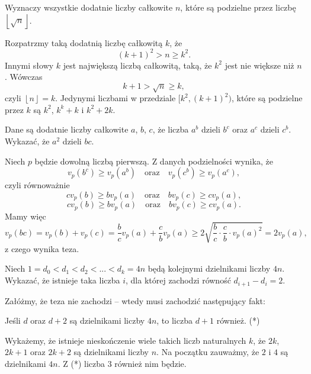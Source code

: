 \newpage
{}

\begin{problem}{1}
	Wyznaczy wszystkie dodatnie liczby całkowite $n$, które są podzielne przez liczbę~$\left\lfloor \sqrt{n} \right\rfloor$.
\end{problem}


\noindent
Rozpatrzmy taką dodatnią liczbę całkowitą $k$, że
\[
	(k + 1)^2 > n \geqslant k^2.
\]
Innymi słowy $k$ jest największą liczbą całkowitą, taką, że $k^2$ jest nie większe niż $n$. Wówczas
\[
	k + 1 > \sqrt{n} \geqslant k,
\]
czyli $\left\lfloor n \right\rfloor = k$. Jedynymi liczbami w przedziale $[k^2, (k + 1)^2)$, które są podzielne przez $k$ są $k^2$, $k^k + k$ i $k^2 + 2k$.


\begin{problem}{2}
	Dane są dodatnie liczby całkowite $a$, $b$, $c$, że liczba $a^b$ dzieli $b^c$ oraz $a^c$ dzieli $c^b$. Wykazać, że $a^2$ dzieli $bc$.
\end{problem}

\noindent
Niech $p$ będzie dowolną liczbą pierwszą.
Z danych podzielności wynika, że
\[
	v_p(b^c) \geqslant v_p(a^b) \quad \text{oraz} \quad v_p(c^b) \geqslant v_p(a^c),
\]
czyli równoważnie
\[
	cv_p(b) \geqslant bv_p(a) \quad \text{oraz} \quad bv_p(c) \geqslant cv_p(a),
\]
\[
	cv_p(b) \geqslant bv_p(a) \quad \text{oraz} \quad bv_p(c) \geqslant cv_p(a).
\]
Mamy więc
\[
	v_p(bc) = v_p(b) + v_p(c) = \frac{b}{c}v_p(a) +  \frac{c}{b}v_p(a) \geqslant 2\sqrt{\frac{b}{c} \cdot \frac{c}{b} \cdot v_p(a)^2} = 2v_p(a),
\]
z czego wynika teza.


\begin{problem}{3}
	Niech $1 = d_0 < d_1 < d_2 < ... < d_k = 4n$ będą kolejnymi dzielnikami liczby $4n$. Wykazać, że istnieje taka liczba $i$, dla której zachodzi równość $d_{i + 1} - d_i = 2$.
\end{problem}

\noindent
Załóżmy, że teza nie zachodzi -- wtedy musi zachodzić następujący fakt:
\begin{center} 
	Jeśli $d$ oraz $d + 2$ są dzielnikami liczby $4n$, to liczba $d + 1$ również. (*)
\end{center}
Wykażemy, że istnieje nieskończenie wiele takich liczb naturalnych $k$, że $2k$, $2k + 1$ oraz $2k + 2$ są dzielnikami liczby $n$. Na początku zauważmy, że $2$ i $4$ są dzielnikami $4n$. Z (*) liczba $3$ również nim będzie. 

